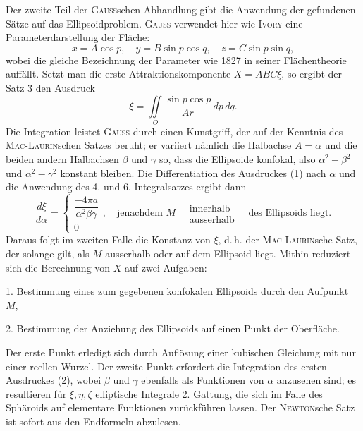 Der zweite Teil der \textsc{Gauss}schen Abhandlung gibt die Anwendung der
gefundenen Sätze auf das Ellipsoidproblem. \textsc{Gauss} verwendet hier wie \textsc{Ivory}
eine Parameterdarstellung der Fläche:
\[
x=A\cos p,\quad y=B\sin p\cos q,\quad z=C\sin p\sin q,
\]
\noindent wobei die gleiche Bezeichnung der Parameter wie 1827 in seiner Flächentheorie
auffällt. Setzt man die erste Attraktionskomponente \(X=ABC\xi\), so ergibt
der Satz 3 den Ausdruck
\[
\xi=\iint\limits_O\frac{\sin p\cos p}{Ar}\,dp\,dq.\tag{1}
\]
\noindent Die Integration leistet \textsc{Gauss} durch einen Kunstgriff, der auf der Kenntnis
des \textsc{Mac-Laurin}schen Satzes beruht; er variiert nämlich die Halbachse \(A=\alpha\)
und die beiden andern Halbachsen \(\beta\) und \(\gamma\) so, dass die Ellipsoide konfokal,
also \(\alpha^2-\beta^2\) und \(\alpha^2-\gamma^2\) konstant bleiben. Die Differentiation des Ausdruckes
\clearpage{}
\noindent (1) nach \(\alpha\) und die Anwendung des 4. und 6. Integralsatzes ergibt dann
\begingroup\small
\[
\frac{d\xi}{d\alpha}=\left\{\begin{array}{c}\dfrac{-4\pi a}{\alpha^2\beta\gamma}\\0\end{array}\right.,
\quad\text{jenachdem }M\quad
\begin{array}{l}\text{innerhalb}\\\text{ausserhalb}\end{array}
\quad\text{des Ellipsoids liegt.}\tag{2}
\]
\endgroup
\noindent Daraus folgt im zweiten Falle die Konstanz von \(\xi\), d.\,h. der \textsc{Mac-Laurin}sche
Satz, der solange gilt, als \(M\) ausserhalb oder auf dem Ellipsoid liegt. Mithin
reduziert sich die Berechnung von \(X\) auf zwei Aufgaben:

1. Bestimmung eines zum gegebenen konfokalen Ellipsoids durch den
Aufpunkt \(M\),

2. Bestimmung der Anziehung des Ellipsoids auf einen Punkt der Oberfläche.

Der erste Punkt erledigt sich durch Auflösung einer kubischen Gleichung
mit nur einer reellen Wurzel. Der zweite Punkt erfordert die Integration
des ersten Ausdruckes (2), wobei \(\beta\) und \(\gamma\) ebenfalls als Funktionen von \(\alpha\) anzusehen
sind; es resultieren für \(\xi,\eta,\zeta\) elliptische Integrale 2. Gattung, die
sich im Falle des Sphäroids auf elementare Funktionen zurückführen lassen.
Der \textsc{Newton}sche Satz ist sofort aus den Endformeln abzulesen.

